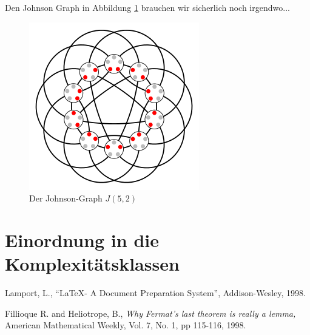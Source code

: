 \documentclass[a4paper]{article}
\begin{document}
Den Johnson Graph in Abbildung \ref{fig:j52} brauchen wir sicherlich noch irgendwo...


\begin{figure}
\centering
\includegraphics[scale=0.8]{j52.png}
\caption{Der Johnson-Graph $J(5,2)$}\label{fig:j52}
\end{figure}

\section{Einordnung in die Komplexitätsklassen}

\begin{thebibliography}{9}
         {\sc Lamport, L.,}
         ``\LaTeX - A Document Preparation System'',
         Addison-Wesley, 1998.

         {\sc Fillioque R.} and {\sc Heliotrope, B.,}
         {\em Why Fermat's last theorem is really a lemma,}
         American Mathematical Weekly,
         Vol. 7, No. 1, pp 115-116, 1998.

\end{thebibliography}
\end{document}
